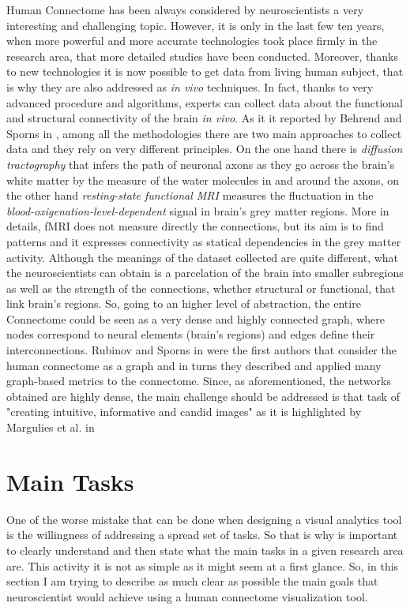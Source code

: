\documentclass{article}
\begin{document}
\begin{multicols}{2}
Human Connectome has been always considered by neuroscientists a very interesting and challenging topic. However, it is only in the last few ten years, when more powerful and more accurate technologies took place firmly in the research area, that more detailed studies have been conducted. Moreover, thanks to new technologies it is now possible to get data from living human subject, that is why they are also addressed as \textit{in vivo} techniques. In fact, thanks to very advanced procedure and algorithms, experts can collect data about the functional and structural connectivity of the brain \textit{in vivo}. As it it reported by Behrend and Sporns in \cite{humanConnectomics}, among all the methodologies there are two main approaches to collect data and they rely on very different principles. On the one hand there is \textit{diffusion tractography} that infers the path of neuronal axons as they go across the brain's white matter by the measure of the water molecules in and around the axons, on the other hand \textit{resting-state functional MRI} measures the fluctuation in the \textit{blood-oxigenation-level-dependent} signal in brain's grey matter regions. More in details, fMRI does not measure directly the connections, but its aim is to find patterns and it expresses connectivity as statical dependencies in the grey matter activity. Although the meanings of the dataset collected are quite different, what the neuroscientists can obtain is a parcelation of the brain into smaller subregions as well as the strength of the connections, whether structural or functional, that link brain's regions. So, going to an higher level of abstraction, the entire Connectome could be seen as a very dense and highly connected graph, where nodes correspond to neural elements (brain's regions) and edges define their interconnections. Rubinov and Sporns in \cite{complexNetworkMeasures} were the first authors that consider the human connectome as a graph and in turns they described and applied many graph-based metrics to the connectome. Since, as aforementioned, the networks obtained are highly dense, the main challenge should be addressed is that task of "creating intuitive, informative and candid images" as it is highlighted by Margulies et al. in \cite{visualizingHumanConnectome}

\section{Main Tasks}
\label{sec:mainTasks}
One of the worse mistake that can be done when designing a visual analytics tool is the willingness of addressing a spread set of tasks. So that is why is important to clearly understand and then state what the main tasks in a given research area are. This activity it is not as simple as it might seem at a first glance. So, in this section I am trying to describe as much clear as possible the main goals that neuroscientist would achieve using a human connectome visualization tool.\\


\end{multicols}
\end{document}

